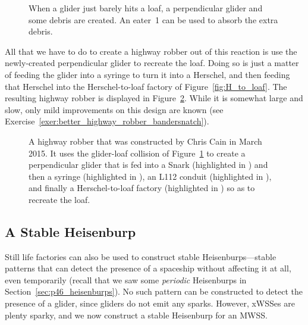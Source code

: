 \begin{figure}[!htb]
	\centering
	\caption{When a glider just barely hits a loaf, a perpendicular glider and some debris are created. An eater~1 can be used to absorb the extra debris.}
	\label{fig:glider_loaf_collision}
\end{figure}

All that we have to do to create a highway robber out of this reaction is use the newly-created perpendicular glider to recreate the loaf. Doing so is just a matter of feeding the glider into a syringe to turn it into a Herschel, and then feeding that Herschel into the Herschel-to-loaf factory of Figure~\ref{fig:H_to_loaf}. The resulting highway robber is displayed in Figure~\ref{fig:highway_robber}. While it is somewhat large and slow, only mild improvements on this design are known (see Exercise~\ref{exer:better_highway_robber_bandersnatch}).

\begin{figure}[!htb]
	\centering
	\caption{A highway robber that was constructed by Chris Cain in March 2015. It uses the glider-loaf collision of Figure~\ref{fig:glider_loaf_collision} to create a perpendicular glider that is fed into a Snark (highlighted in ) and then a syringe (highlighted in ), an L112 conduit (highlighted in ), and finally a Herschel-to-loaf factory (highlighted in ) so as to recreate the loaf.}
	\label{fig:highway_robber}
\end{figure}


\subsection{A Stable Heisenburp}\label{sec:stable_heisenburp}

Still life factories can also be used to construct stable Heisenburps---stable patterns that can detect the presence of a spaceship without affecting it at all, even temporarily (recall that we saw some \emph{periodic} Heisenburps in Section~\ref{sec:p46_heisenburps}). No such pattern can be constructed to detect the presence of a glider, since gliders do not emit any sparks. However, xWSSes are plenty sparky, and we now construct a stable Heisenburp for an MWSS.

